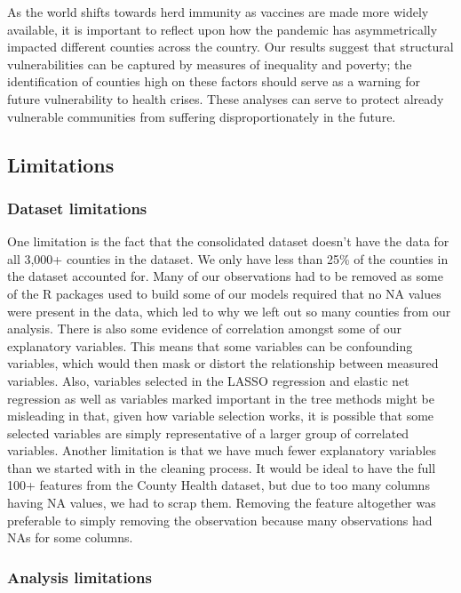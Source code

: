 \documentclass[
]{article}
\begin{document}
As the world shifts towards herd immunity as vaccines are made more widely available, it is important to reflect upon how the pandemic has asymmetrically impacted different counties across the country. Our results suggest that structural vulnerabilities can be captured by measures of inequality and poverty; the identification of counties high on these factors should serve as a warning for future vulnerability to health crises. These analyses can serve to protect already vulnerable communities from suffering disproportionately in the future.

\hypertarget{limitations}{%
\subsection{Limitations}\label{limitations}}

\hypertarget{dataset-limitations}{%
\subsubsection{Dataset limitations}\label{dataset-limitations}}

One limitation is the fact that the consolidated dataset doesn't have the data for all 3,000+ counties in the dataset. We only have less than 25\% of the counties in the dataset accounted for. Many of our observations had to be removed as some of the R packages used to build some of our models required that no NA values were present in the data, which led to why we left out so many counties from our analysis. There is also some evidence of correlation amongst some of our explanatory variables. This means that some variables can be confounding variables, which would then mask or distort the relationship between measured variables. Also, variables selected in the LASSO regression and elastic net regression as well as variables marked important in the tree methods might be misleading in that, given how variable selection works, it is possible that some selected variables are simply representative of a larger group of correlated variables. Another limitation is that we have much fewer explanatory variables than we started with in the cleaning process. It would be ideal to have the full 100+ features from the County Health dataset, but due to too many columns having NA values, we had to scrap them. Removing the feature altogether was preferable to simply removing the observation because many observations had NAs for some columns.

\hypertarget{analysis-limitations}{%
\subsubsection{Analysis limitations}\label{analysis-limitations}}
\end{document}
